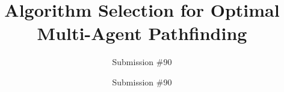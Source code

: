 \documentclass[letterpaper]{article} %
\author{Submission \#90}
\begin{document}
\title{Algorithm Selection for Optimal Multi-Agent Pathfinding}







\author{Submission \#90}

\maketitle
\end{document}
